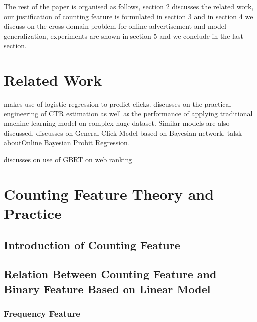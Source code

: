 \documentclass{sig-alternate}
\begin{document}
The rest of the paper is organised as follows, section 2 discusses the related work, our justification of counting feature is formulated in section 3 and in section 4 we discuss on the cross-domain problem for online advertisement and model generalization, experiments are shown in section 5 and we conclude in the last section.



\section{Related Work}


 \cite{richardson2007predicting} makes use of logistic regression to predict clicks. \cite{mcmahan2013ad} discusses on the practical engineering of CTR estimation as well as the performance of applying traditional machine learning model on complex huge dataset. Similar models are also discussed. \cite{zhu2010novel} discusses on General Click Model based on Bayesian network. \cite{graepel2010web} talsk aboutOnline Bayesian Probit Regression. 



\cite{mohan2011web} discusses on use of GBRT on web ranking






\section{Counting Feature Theory and Practice}
\subsection{Introduction of Counting Feature}
\subsection{Relation Between Counting Feature and Binary Feature Based on Linear Model}
\subsubsection{Frequency Feature}
\setlength{\parindent}{5ex}
\end{document}
